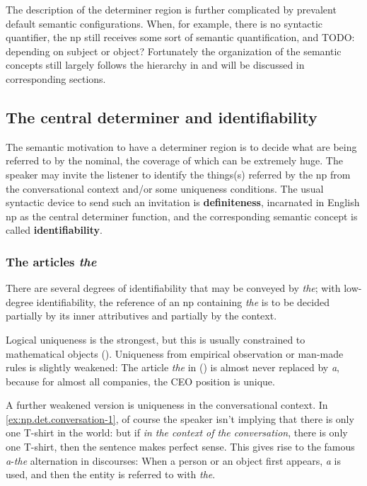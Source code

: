 \documentclass[UTF8, a4paper, oneside, scheme=plain, 12pt]{ctexbook}
\newcommand*{\concept}[1]{\textbf{#1}}
\newcommand{\form}[1]{\emph{#1}}
\begin{document}
The description of the determiner region 
is further complicated by 
prevalent default semantic configurations. 
When, for example, there is no syntactic quantifier,
the \acs{np} still receives some sort of semantic quantification,
and TODO: depending on subject or object?
Fortunately the organization of the semantic concepts still largely follows 
the hierarchy in  
and will be discussed in corresponding sections.

\subsection{The central determiner and identifiability }\label{sec:np.det.definite}

The semantic motivation to have a determiner region is 
to decide what are being referred to by the nominal,
the coverage of which can be extremely huge.
The speaker may invite the listener to 
identify the things(s) referred by the \acs{np} 
from the conversational context
and/or some uniqueness conditions.
The usual syntactic device to send such an invitation 
is \concept{definiteness},
incarnated in English \acs{np} as the central determiner function,
and the corresponding semantic concept is called \concept{identifiability}.




\subsubsection{The articles \form{the}}

There are several degrees of identifiability that may be conveyed by \form{the};
with low-degree identifiability, 
the reference of an \acs{np} containing \form{the} is 
to be decided partially by its inner attributives and partially by the context.

Logical uniqueness is the strongest, 
but this is usually constrained to mathematical objects
().
Uniqueness from empirical observation or man-made rules is slightly weakened:
The article \form{the} in ()
is almost never replaced by \form{a},
because for almost all companies,
the CEO position is unique.

A further weakened version is uniqueness in the conversational context.
In \eqref{ex:np.det.conversation-1}, 
of course the speaker isn't implying that there is only one T-shirt in the world:
but if \emph{in the context of the conversation},
there is only one T-shirt,
then the sentence makes perfect sense.
This gives rise to the famous \form{a}-\form{the} alternation in discourses:
When a person or an object first appears,
\form{a} is used,
and then the entity is referred to with \form{the}.
\end{document}
